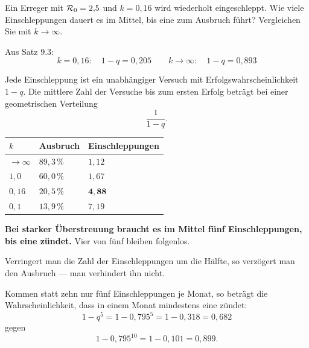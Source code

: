 \begin{aufgabe}
Ein Erreger mit $\mathcal{R}_0 = 2{,}5$ und $k = 0{,}16$ wird wiederholt eingeschleppt. Wie viele Einschleppungen dauert es im Mittel, bis eine zum Ausbruch führt? Vergleichen Sie mit $k \to \infty$.

\loesung
{}
Aus Satz 9.3:
\[ k = 0{,}16: \quad 1-q = 0{,}205 \qquad k \to \infty: \quad 1-q = 0{,}893 \]

Jede Einschleppung ist ein unabhängiger Versuch mit Erfolgswahrscheinlichkeit $1-q$. Die mittlere Zahl der Versuche bis zum ersten Erfolg beträgt bei einer geometrischen Verteilung
\[ \frac{1}{1-q} . \]

\begin{center}
\renewcommand{\arraystretch}{1.48}
\begin{tabular}{@{}P{2.0cm}P{2.2cm}P{3.2cm}@{}}
\toprule
$k$ & \textbf{Ausbruch} & \textbf{Einschlep\-pungen}\\
\midrule
$\to\infty$ & $89{,}3\,\%$ & $1{,}12$\\
$1{,}0$ & $60{,}0\,\%$ & $1{,}67$\\
$0{,}16$ & $20{,}5\,\%$ & $\mathbf{4{,}88}$\\
$0{,}1$ & $13{,}9\,\%$ & $7{,}19$\\
\bottomrule
\end{tabular}
\end{center}

\begin{center}
\begin{minipage}{0.9\textwidth}
\textbf{Bei starker Überstreuung braucht es im Mittel fünf Einschleppungen, bis eine zündet.} Vier von fünf bleiben folgenlos.
\end{minipage}
\end{center}

Verringert man die Zahl der Einschleppungen um die Hälfte, so verzögert man den Ausbruch --- man verhindert ihn nicht.

 Kommen statt zehn nur fünf Einschleppungen je Monat, so beträgt die Wahrscheinlichkeit, dass in einem Monat mindestens eine zündet:
\[ 1 - q^{5} = 1 - 0{,}795^{5} = 1 - 0{,}318 = 0{,}682 \]
gegen
\[ 1 - 0{,}795^{10} = 1 - 0{,}101 = 0{,}899 . \]


\end{aufgabe}
